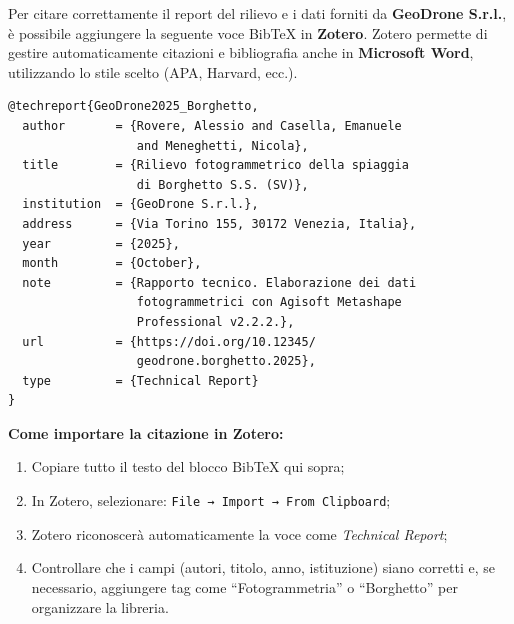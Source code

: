 \documentclass[9pt,a4paper,twocolumn,twoside]{tau-class/tau}
\begin{document}

\printbibliography


\clearpage

\begin{tauenv}[frametitle=Citazione del report tecnico e dei dati associati]
Per citare correttamente il report del rilievo e i dati forniti da \textbf{GeoDrone S.r.l.}, è possibile aggiungere la seguente voce BibTeX in \textbf{Zotero}.  
Zotero permette di gestire automaticamente citazioni e bibliografia anche in \textbf{Microsoft Word}, utilizzando lo stile scelto (APA, Harvard, ecc.).

\vspace{0.5em}
\noindent\begin{minipage}{\columnwidth}
\scriptsize
\raggedright
\begin{verbatim}
@techreport{GeoDrone2025_Borghetto,
  author       = {Rovere, Alessio and Casella, Emanuele 
                  and Meneghetti, Nicola},
  title        = {Rilievo fotogrammetrico della spiaggia 
                  di Borghetto S.S. (SV)},
  institution  = {GeoDrone S.r.l.},
  address      = {Via Torino 155, 30172 Venezia, Italia},
  year         = {2025},
  month        = {October},
  note         = {Rapporto tecnico. Elaborazione dei dati 
                  fotogrammetrici con Agisoft Metashape 
                  Professional v2.2.2.},
  url          = {https://doi.org/10.12345/
                  geodrone.borghetto.2025},
  type         = {Technical Report}
}
\end{verbatim}
\end{minipage}

\vspace{0.5em}
\noindent
\textbf{Come importare la citazione in Zotero:}
\begin{enumerate}
  \item Copiare tutto il testo del blocco BibTeX qui sopra;
  \item In Zotero, selezionare: \texttt{File → Import → From Clipboard};
  \item Zotero riconoscerà automaticamente la voce come \textit{Technical Report};
  \item Controllare che i campi (autori, titolo, anno, istituzione) siano corretti e, se necessario, aggiungere tag come “Fotogrammetria” o “Borghetto” per organizzare la libreria.
\end{enumerate}


\end{tauenv}
\end{document}
